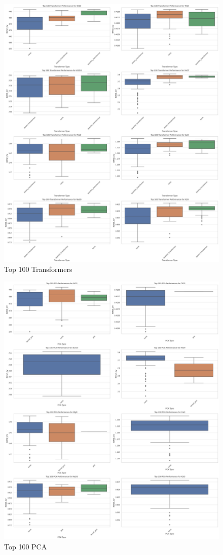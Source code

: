 \begin{figure}
    \centering
    \includegraphics[width=\textwidth]{images/top100/transformers.png}
    \caption{Top 100 Transformers}
    \label{fig:top100_transformers}
\end{figure}

\begin{figure}
    \centering
    \includegraphics[width=\textwidth]{images/top100/pca.png}
    \caption{Top 100 PCA}
    \label{fig:top100_pca}
\end{figure}
